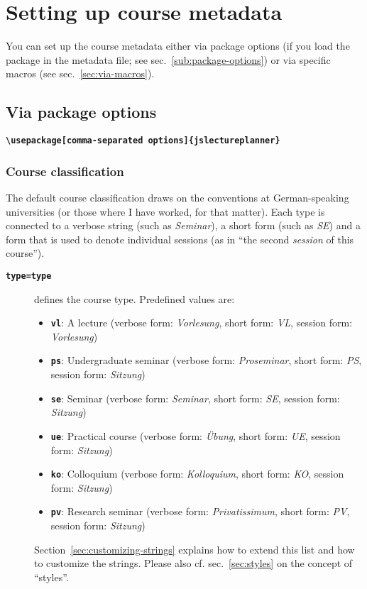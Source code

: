 \documentclass[english]{article}
\newcommand*\jmacro[1]{\textbf{\texttt{#1}}}
\newcommand*\jcsmacro[1]{\jmacro{\textbackslash{#1}}}
\newcommand*\joption[1]{\textbf{\texttt{#1}}}
\newcommand*\jparam[1]{\angus #1\angud}
\begin{document}
\section{Setting up course metadata\label{sec:course-metadata}}

You can set up the course metadata either via package options (if
you load the package in the metadata file; see sec.~\ref{sub:package-options})
or via specific macros (see sec.~\ref{sec:via-macros}).


\subsection{Via package options\label{sub:package-options}}

\jcsmacro{usepackage[\jparam{comma-separated options}]\{jslectureplanner\}}

\subsubsection{Course classification\label{sec:lecture-classification}}

The default course classification draws on the conventions at German-speaking
universities (or those where I have worked, for that matter). Each type is
connected to a verbose string (such as \emph{Seminar}), a short form (such as
\emph{SE}) and a form that is used to denote individual sessions (as
in ``the second \emph{session} of this course'').
\begin{description}
\item [\joption{type=\jparam{type}}] defines the course type. Predefined values are:

\begin{itemize}
\item \joption{vl}: A lecture (verbose form: \emph{Vorlesung}, short form:
      \emph{VL}, session form: \emph{Vorlesung})
\item \joption{ps}: Undergraduate seminar (verbose form: \emph{Proseminar},
      short form: \emph{PS}, session form: \emph{Sitzung})
\item \joption{se}: Seminar (verbose form: \emph{Seminar}, short form:
      \emph{SE}, session form: \emph{Sitzung})
\item \joption{ue}: Practical course (verbose form: \emph{Übung}, short
      form: \emph{UE}, session form: \emph{Sitzung})
\item \joption{ko}: Colloquium (verbose form: \emph{Kolloquium}, short form:
      \emph{KO}, session form: \emph{Sitzung})
\item \joption{pv}: Research seminar (verbose form: \emph{Privatissimum},
      short form: \emph{PV}, session form: \emph{Sitzung})
\end{itemize}

Section~\ref{sec:customizing-strings} explains how to extend this list and how
to customize the strings.
Please also cf. sec.~\ref{sec:styles} on the concept of ``styles''.
\end{description}
\end{document}
